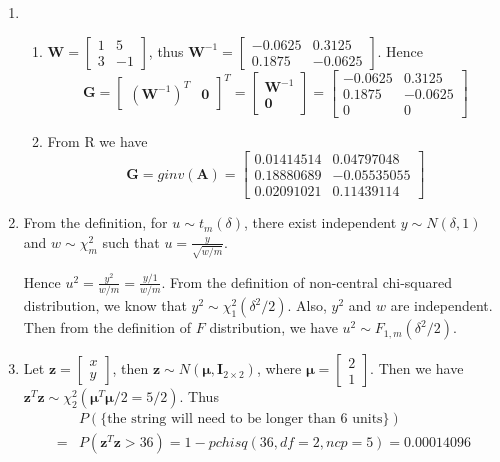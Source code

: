 \documentclass{article}
\begin{document}
\begin{enumerate}[leftmargin = 0 em, label = \arabic*., font = \bfseries]
\item 
\begin{enumerate}
	\item 
	$\bm W = \begin{bmatrix}
			1 & 5 \\
			3 & -1
		\end{bmatrix}$, thus $\bm W^{-1} = \begin{bmatrix}
			-0.0625 &  0.3125\\
			0.1875 & -0.0625
		\end{bmatrix}$. Hence
		\[\bm G = \begin{bmatrix}
			(\bm W^{-1})^{T} & \bm 0
		\end{bmatrix}^T = \begin{bmatrix}
			\bm W^{-1}\\
			\bm 0
		\end{bmatrix} = \begin{bmatrix}
			-0.0625 &  0.3125\\
			0.1875 & -0.0625\\
			0 & 0
		\end{bmatrix}\]

		\item 
		From R we have
		\[\bm G = ginv(\bm A) = 
		\begin{bmatrix}
			 0.01414514  &0.04797048\\
             0.18880689 &-0.05535055\\
			 0.02091021  &0.11439114
		\end{bmatrix}\]

\end{enumerate}

\item 
From the definition, for $u \sim t_m (\delta)$, there exist independent $y \sim N(\delta , 1)$ and $w \sim \chi_m^2$ such that $u = \frac{y}{\sqrt{w/m}}$. 

Hence $u^2 =  \frac{y^2}{w/m} = \frac{y/1}{w/m}$. From the definition of non-central chi-squared distribution, we know that $y^2 \sim \chi_1^2 (\delta^2 / 2)$. Also, $y^2$ and $w$ are independent. Then from the definition of $F$ distribution, we have $u^2 \sim F_{1,m}(\delta^2/2)$.

\item 
Let $\bm z = \begin{bmatrix}
	x\\y
\end{bmatrix}$, then $\bm z \sim N(\bm \mu, \bm I_{2\times 2})$, where $\bm \mu = \begin{bmatrix}
	2\\1
\end{bmatrix}$. Then we have $\bm z^T \bm z \sim \chi_2^2 (\bm \mu^T \bm \mu / 2 = 5/2)$. Thus
\begin{align*}
&P(\textrm{\{the string will need to be
longer than 6 units\}})\\
=& P(\bm z^T \bm z > 36) =    1 - pchisq(36, df = 2, ncp = 5) = 0.00014096
\end{align*}


\end{enumerate}
\end{document}
